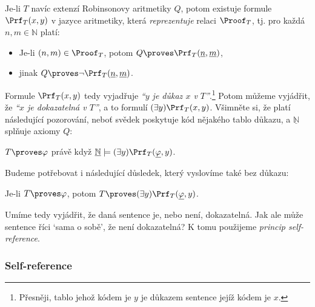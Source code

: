 \begin{proposition}
Je-li $T$ navíc extenzí Robinsonovy aritmetiky $Q$, potom existuje formule $\Prf_T(x,y)$ v jazyce aritmetiky, která \emph{reprezentuje} relaci $\Proof_T$, tj. pro každá $n,m\in\mathbb N$ platí:
\begin{itemize}
    \item Je-li $(n,m)\in\Proof_T$, potom $Q\proves\Prf_T(\underline{n},\underline{m})$,
    \item jinak $Q\proves\neg\Prf_T(\underline{n},\underline{m})$.
\end{itemize} 
\end{proposition}

Formule $\Prf_T(x,y)$ tedy vyjadřuje \emph{``$y$ je důkaz $x$ v $T$''}.\footnote{Přesněji, tablo jehož kódem je $y$ je důkazem sentence jejíž kódem je $x$.} Potom můžeme vyjádřit, že \emph{``$x$ je dokazatelná v $T$''}, a to formulí $(\exists y)\Prf_T(x,y)$. Všimněte si, že platí následující pozorování, neboť svědek poskytuje kód nějakého tablo důkazu, a $\underline{\mathbb N}$ splňuje axiomy $Q$:
\begin{observation}\label{observation:proof-predicate}
$T\proves\varphi$ právě když $\underline{\mathbb N}\models (\exists y)\Prf_T(\underline{\varphi},y)$.  
\end{observation}
Budeme potřebovat i následující důsledek, který vyslovíme také bez důkazu:
\begin{corollary}\label{corollary:predicate-of-provability}
    Je-li $T\proves\varphi$, potom $T\proves (\exists y)\Prf_T(\underline{\varphi},y)$.
\end{corollary}

Umíme tedy vyjádřit, že daná sentence je, nebo není, dokazatelná. Jak ale může sentence říci `sama o sobě', že není dokazatelná? K tomu použijeme \emph{princip self-reference}.

\subsubsection*{Self-reference}

